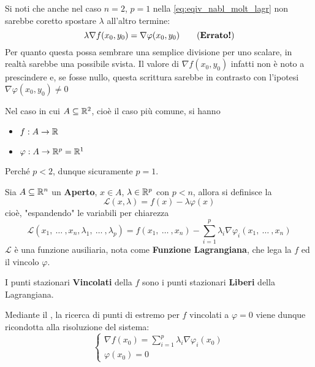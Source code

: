 \begin{observation}
	Si noti che anche nel caso $n = 2$, $p = 1$ nella \cref{eq:eqiv_nabl_molt_lagr} non sarebbe coretto spostare $\lambda$ all'altro termine:
	\[\lambda \nabla f(x_0, y_0) = \nabla \varphi (x_0, y_0) \tag{\textbf{Errato!}}\]
	Per quanto questa possa sembrare una semplice divisione per uno scalare, in realtà sarebbe una possibile svista. Il valore di $\nabla f(x_0,y_0)$ infatti non è noto a prescindere e, se fosse nullo, questa scrittura sarebbe in contrasto con l'ipotesi $\nabla \varphi(x_0,y_0) \neq 0$
\end{observation}
\begin{example}
	\label{ex:max_min_vinc_n2_p1}
	Nel caso in cui $A \subseteq \mathbb{R}^2$, cioè il caso più comune, si hanno
	\begin{itemize}[noitemsep]
		\item $f: A \to \mathbb{R}$
		\item $\varphi: A \to \mathbb{R}^p = \mathbb{R}^1$
	\end{itemize}
	Perché $p < 2$, dunque sicuramente $p = 1$.
\end{example}
\color{not_explained_section_color}
\begin{definition}[Funzione Lagrangiana] %
	\label{def:funz_lagr}
	Sia $A \subseteq \mathbb{R}^n$ un \textbf{Aperto}, $x \in A$, $\lambda \in \mathbb{R}^p$ con $p < n$, allora si definisce la
	\[\mathcal{L}(x, \lambda) = f(x) - \lambda \varphi(x)\]
	cioè, "espandendo" le variabili per chiarezza
	\[\mathcal{L}(x_1,\:\dotsc\:,x_n, \lambda_1,\:\dotsc\:,\lambda_p) = f(x_1,\:\dotsc\:,x_n) - \sum\limits_{i = 1}^{p} \lambda_i \nabla \varphi_i (x_1,\:\dotsc\:,x_n)\]
	$\mathcal{L}$ è una funzione ausiliaria, nota come \textbf{Funzione Lagrangiana}, che lega la $f$ ed il vincolo $\varphi$.

	\noindent I punti stazionari \textbf{Vincolati} della $f$ sono i punti stazionari \textbf{Liberi} della Lagrangiana.
\end{definition}
\color{black}
\begin{observation}
	\label{obs:sist_eqiv_lagr}
	Mediante il , la ricerca di punti di estremo per $f$ vincolati a $\varphi = 0$ viene dunque ricondotta alla risoluzione del sistema:
	\begin{equation}
		\label{eq:teo_molt_lagr_gen_sist_varphi}
		\begin{cases}
			\nabla f(x_0) = \sum\limits_{i = 1}^{p} \lambda_i \nabla \varphi_i (x_0)\\
			\varphi(x_0) = 0
		\end{cases}
	\end{equation}
\end{observation}
